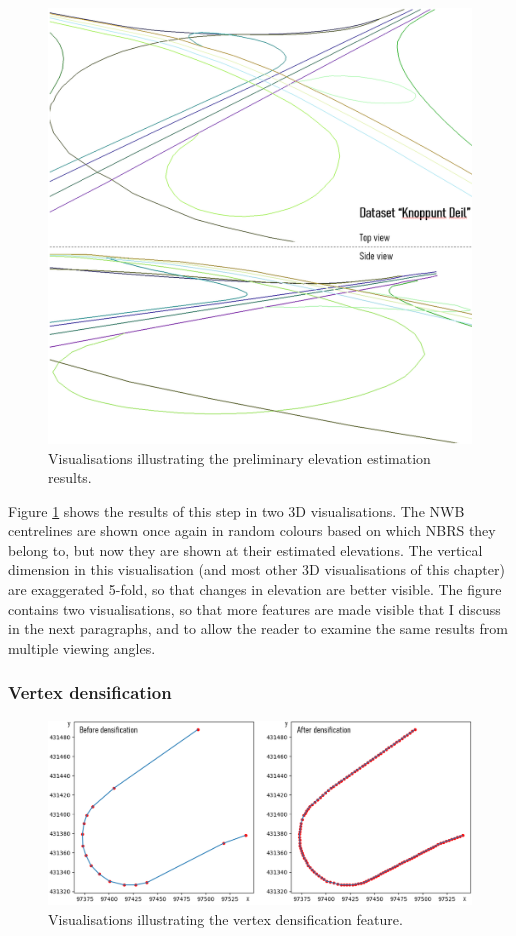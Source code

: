 \begin{figure}[]
    \centering
    \includegraphics[width=0.9\linewidth]{final_report/figs/elevationestimation0.png}
    \caption{Visualisations illustrating the preliminary elevation estimation results.}
    \label{fig:elevationestimation0}
\end{figure}

Figure \ref{fig:elevationestimation0} shows the results of this step in two 3D visualisations. The NWB centrelines are shown once again in random colours based on which NBRS they belong to, but now they are shown at their estimated elevations. The vertical dimension in this visualisation (and most other 3D visualisations of this chapter) are exaggerated 5-fold, so that changes in elevation are better visible. The figure contains two visualisations, so that more features are made visible that I discuss in the next paragraphs, and to allow the reader to examine the same results from multiple viewing angles.

\subsubsection{Vertex densification}

\begin{figure}[]
    \centering
    \includegraphics[width=0.9\linewidth]{final_report/figs/elevationestimation1.png}
    \caption{Visualisations illustrating the vertex densification feature.}
    \label{fig:elevationestimation1}
\end{figure}

